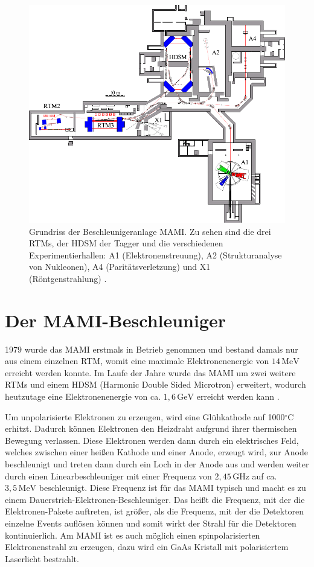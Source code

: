 \documentclass[a4paper,11pt,oneside,final,german,openbib,pdftex]{scrbook}
\begin{document}
{\begin{figure}[h!]
	\includegraphics{grundriss}
	\caption[Grundriss der MAMI-Anlage]{Grundriss der Beschleunigeranlage MAMI. Zu sehen sind die drei RTMs, der HDSM der Tagger und die verschiedenen Experimentierhallen: A1 (Elektronenstreuung), A2 (Strukturanalyse von Nukleonen), A4 (Parit\"atsverletzung) und X1 (R\"ontgenstrahlung) \cite{KPh07}.}
	\label{fig.grundriss_anlage}
\end{figure}


\section{Der MAMI-Beschleuniger}
1979 wurde das MAMI erstmals in Betrieb genommen und bestand damals nur aus einem einzelnen RTM, womit eine maximale Elektronenenergie von $14\, \text{MeV}$ erreicht werden konnte. 
Im Laufe der Jahre wurde das MAMI um zwei weitere RTMs und einem HDSM (Harmonic Double Sided Microtron) erweitert, wodurch heutzutage eine Elektronenenergie von ca. $1,6\, \text{GeV}$ erreicht werden kann \cite{KPh11G}. 
\newline


Um unpolarisierte Elektronen zu erzeugen, wird eine Glühkathode auf 1000$^{\circ}$C erhitzt. Dadurch können Elektronen den Heizdraht aufgrund ihrer thermischen Bewegung verlassen. Diese Elektronen werden dann durch ein elektrisches Feld, welches zwischen einer heißen Kathode und einer Anode, erzeugt wird, zur Anode beschleunigt und treten dann durch ein Loch in der Anode aus und werden weiter durch einen Linearbeschleuniger mit einer Frequenz von $2,45\, \text{GHz}$ auf ca. $3,5\, \text{MeV}$ beschleunigt. Diese Frequenz ist für das MAMI typisch und macht es zu einem Dauerstrich-Elektronen-Beschleuniger. Das heißt die Frequenz, mit der die Elektronen-Pakete auftreten, ist größer, als die Frequenz, mit der die Detektoren einzelne Events auflösen können und somit wirkt der Strahl für die Detektoren kontinuierlich.
Am MAMI ist es auch m\"oglich einen spinpolarisierten Elektronenstrahl zu erzeugen, dazu wird ein GaAs Kristall mit polarisiertem Laserlicht bestrahlt. 

}
\end{document}
